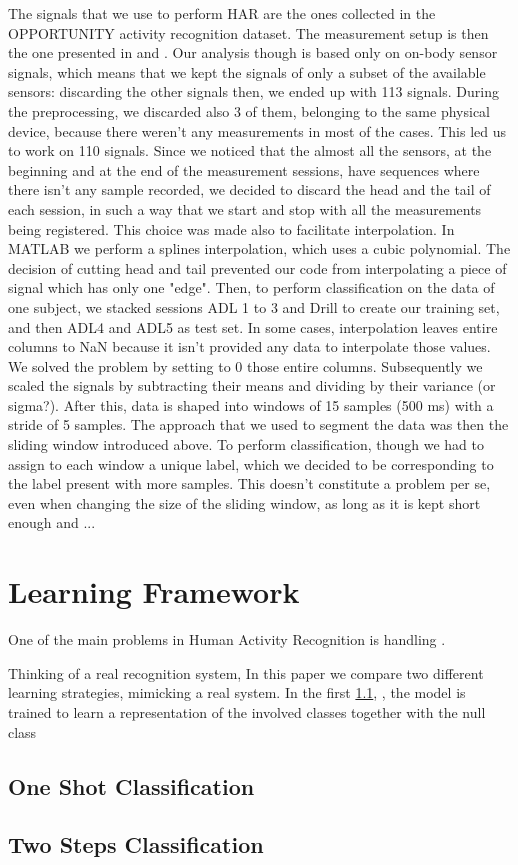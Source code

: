 The signals that we use to perform HAR are the ones collected in the OPPORTUNITY activity recognition dataset. The measurement setup is then the one presented in \cite{Roggen2010} and \cite{Chavarriaga2015}. Our analysis though is based only on on-body sensor signals, which means that we kept the signals of only a subset of the available sensors: discarding the other signals then, we ended up with 113 signals. During the preprocessing, we discarded also 3 of them, belonging to the same physical device, because there weren't any measurements in most of the cases. This led us to work on 110 signals.
Since we noticed that the almost all the sensors, at the beginning and at the end of the measurement sessions, have sequences where there isn't any sample recorded, we decided to discard the head and the tail of each session, in such a way that we start and stop with all the measurements being registered.
This choice was made also to facilitate interpolation. In MATLAB we perform a splines interpolation, which uses a cubic polynomial. The decision of cutting head and tail prevented our code from interpolating a piece of signal which has only one "edge".
Then, to perform classification on the data of one subject, we stacked sessions ADL 1 to 3 and Drill to create our training set, and then ADL4 and ADL5 as test set. In some cases, interpolation leaves entire columns to NaN because it isn't provided any data to interpolate those values. We solved the problem by setting to 0 those entire columns.
Subsequently we scaled the signals by subtracting their means and dividing by their variance (or sigma?). After this, data is shaped into windows of 15 samples (500 ms) with a stride of 5 samples. The approach that we used to segment the data was then the sliding window introduced above. To perform classification, though we had to assign to each window a unique label, which we decided to be corresponding to the label present with more samples. This doesn't constitute a problem per se, even when changing the size of the sliding window, as long as it is kept short enough and ...


\section{Learning Framework}
\label{sec:learning_framework}


One of the main problems in Human Activity Recognition is handling .

Thinking of a real recognition system, 
In this paper we compare two different learning strategies, mimicking a real system. In the first \ref{sub:oneshot}, , the model is trained to learn a representation of the involved classes together with the null class

\subsection{One Shot Classification}
\label{sub:oneshot}

\subsection{Two Steps Classification}
\label{sub:twosteps}
